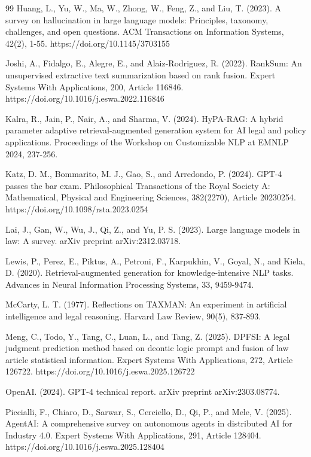 \documentclass[a4paper,fleqn]{cas-dc}
\begin{document}
\begin{thebibliography}{99}
 Huang, L., Yu, W., Ma, W., Zhong, W., Feng, Z., and Liu, T. (2023). A survey on hallucination in large language models: Principles, taxonomy, challenges, and open questions. ACM Transactions on Information Systems, 42(2), 1-55. https://doi.org/10.1145/3703155

 Joshi, A., Fidalgo, E., Alegre, E., and Alaiz-Rodriguez, R. (2022). RankSum: An unsupervised extractive text summarization based on rank fusion. Expert Systems With Applications, 200, Article 116846. https://doi.org/10.1016/j.eswa.2022.116846

 Kalra, R., Jain, P., Nair, A., and Sharma, V. (2024). HyPA-RAG: A hybrid parameter adaptive retrieval-augmented generation system for AI legal and policy applications. Proceedings of the Workshop on Customizable NLP at EMNLP 2024, 237-256.

 Katz, D. M., Bommarito, M. J., Gao, S., and Arredondo, P. (2024). GPT-4 passes the bar exam. Philosophical Transactions of the Royal Society A: Mathematical, Physical and Engineering Sciences, 382(2270), Article 20230254. https://doi.org/10.1098/rsta.2023.0254

 Lai, J., Gan, W., Wu, J., Qi, Z., and Yu, P. S. (2023). Large language models in law: A survey. arXiv preprint arXiv:2312.03718.

 Lewis, P., Perez, E., Piktus, A., Petroni, F., Karpukhin, V., Goyal, N., and Kiela, D. (2020). Retrieval-augmented generation for knowledge-intensive NLP tasks. Advances in Neural Information Processing Systems, 33, 9459-9474.

 McCarty, L. T. (1977). Reflections on TAXMAN: An experiment in artificial intelligence and legal reasoning. Harvard Law Review, 90(5), 837-893.

 Meng, C., Todo, Y., Tang, C., Luan, L., and Tang, Z. (2025). DPFSI: A legal judgment prediction method based on deontic logic prompt and fusion of law article statistical information. Expert Systems With Applications, 272, Article 126722. https://doi.org/10.1016/j.eswa.2025.126722

 OpenAI. (2024). GPT-4 technical report. arXiv preprint arXiv:2303.08774.

 Piccialli, F., Chiaro, D., Sarwar, S., Cerciello, D., Qi, P., and Mele, V. (2025). AgentAI: A comprehensive survey on autonomous agents in distributed AI for Industry 4.0. Expert Systems With Applications, 291, Article 128404. https://doi.org/10.1016/j.eswa.2025.128404


\end{thebibliography}
\end{document}
